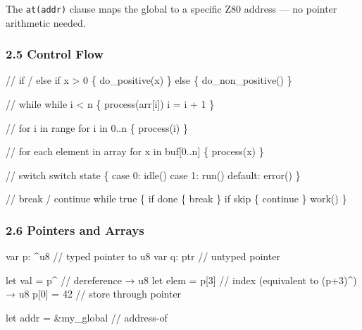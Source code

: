 \documentclass[
  11pt,
  a4paper,
]{report}
\newenvironment{Shaded}{\begin{snugshade}\small}{\end{snugshade}}
\newcommand{\NormalTok}[1]{#1}
\begin{document}
The \texttt{at(addr)} clause maps the global to a specific Z80 address
--- no pointer arithmetic needed.

\subsubsection{2.5 Control Flow}\label{control-flow}

\begin{Shaded}
\begin{Highlighting}[]
\NormalTok{// if / else}
\NormalTok{if x \textgreater{} 0 \{}
\NormalTok{    do\_positive(x)}
\NormalTok{\} else \{}
\NormalTok{    do\_non\_positive()}
\NormalTok{\}}

\NormalTok{// while}
\NormalTok{while i \textless{} n \{}
\NormalTok{    process(arr[i])}
\NormalTok{    i = i + 1}
\NormalTok{\}}

\NormalTok{// for i in range}
\NormalTok{for i in 0..n \{}
\NormalTok{    process(i)}
\NormalTok{\}}

\NormalTok{// for each element in array}
\NormalTok{for x in buf[0..n] \{}
\NormalTok{    process(x)}
\NormalTok{\}}

\NormalTok{// switch}
\NormalTok{switch state \{}
\NormalTok{    case 0: idle()}
\NormalTok{    case 1: run()}
\NormalTok{    default: error()}
\NormalTok{\}}

\NormalTok{// break / continue}
\NormalTok{while true \{}
\NormalTok{    if done \{ break \}}
\NormalTok{    if skip \{ continue \}}
\NormalTok{    work()}
\NormalTok{\}}
\end{Highlighting}
\end{Shaded}

\subsubsection{2.6 Pointers and Arrays}\label{pointers-and-arrays}

\begin{Shaded}
\begin{Highlighting}[]
\NormalTok{var p: \^{}u8              // typed pointer to u8}
\NormalTok{var q: ptr              // untyped pointer}

\NormalTok{let val = p\^{}            // dereference → u8}
\NormalTok{let elem = p[3]         // index (equivalent to (p+3)\^{}) → u8}
\NormalTok{p[0] = 42               // store through pointer}

\NormalTok{let addr = \&my\_global   // address{-}of}
\end{Highlighting}
\end{Shaded}
\end{document}

